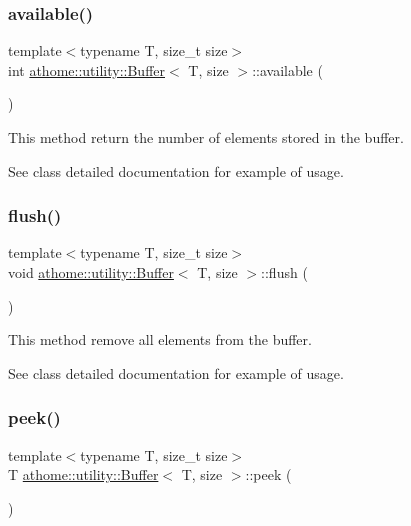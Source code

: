 \subsubsection{\texorpdfstring{available()}{available()}}
{\footnotesize\ttfamily template$<$typename T, size\+\_\+t size$>$ \\
int \mbox{\hyperlink{classathome_1_1utility_1_1_buffer}{athome\+::utility\+::\+Buffer}}$<$ T, size $>$\+::available (\begin{DoxyParamCaption}{ }\end{DoxyParamCaption})\hspace{0.3cm}{\ttfamily [inline]}}

This method return the number of elements stored in the buffer.

See class detailed documentation for example of usage. \mbox{\label{classathome_1_1utility_1_1_buffer_a9fd6b0ad08ed7af5702b43c3b6a617e1}} 
\subsubsection{\texorpdfstring{flush()}{flush()}}
{\footnotesize\ttfamily template$<$typename T, size\+\_\+t size$>$ \\
void \mbox{\hyperlink{classathome_1_1utility_1_1_buffer}{athome\+::utility\+::\+Buffer}}$<$ T, size $>$\+::flush (\begin{DoxyParamCaption}{ }\end{DoxyParamCaption})\hspace{0.3cm}{\ttfamily [inline]}}

This method remove all elements from the buffer.

See class detailed documentation for example of usage. \mbox{\label{classathome_1_1utility_1_1_buffer_a7cd2a38b3f2abc3083f686c49873656a}} 
\subsubsection{\texorpdfstring{peek()}{peek()}}
{\footnotesize\ttfamily template$<$typename T, size\+\_\+t size$>$ \\
T \mbox{\hyperlink{classathome_1_1utility_1_1_buffer}{athome\+::utility\+::\+Buffer}}$<$ T, size $>$\+::peek (\begin{DoxyParamCaption}{ }\end{DoxyParamCaption})\hspace{0.3cm}{\ttfamily [inline]}}

